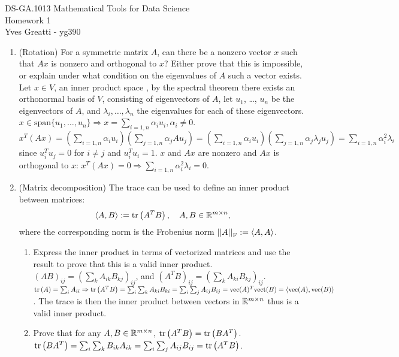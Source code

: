 \documentclass[12pt,twoside]{article}
\begin{document}
\noindent DS-GA.1013 Mathematical Tools for Data Science \\
Homework 1 \\
Yves Greatti - yg390\\


\begin{enumerate}
\item (Rotation) For a symmetric matrix $A$, can there be a nonzero vector $x$ such that $Ax$ is nonzero and orthogonal to $x$? Either prove that this is impossible, or explain under what condition on the eigenvalues of $A$ such a vector exists.
Let $x \in V$, an inner product space , by the spectral theorem there exists an orthonormal basis of  $V$, consisting of eigenvectors of $A$, let $u_1$, \ldots, $u_n$ be the eigenvectors of $A$, and $\lambda_i, \ldots, \lambda_n$ the eigenvalues for each of these eigenvectors.
$x \in \text{span}\{u_1, \ldots, u_n \} \Rightarrow  x=\sum_{i=1,n} \alpha_i u_i, \alpha_i \neq 0$.  $x^T (Ax) = (\sum_{i=1,n} \alpha_i u_i) (\sum_{j=1,n} \alpha_j A u_j) =  (\sum_{i=1,n} \alpha_i u_i) (\sum_{j=1,n} \alpha_j \lambda_j u_j) = \sum_{i=1,n} \alpha_i^2 \lambda_i$ since $u_i^T u_j = 0$ for $i \neq j$ and $u_i^T u_i =1$. $x$ and $Ax$ are nonzero and $Ax$ is orthogonal to $x$: $x^T (Ax) = 0 \Rightarrow  \sum_{i=1,n} \alpha_i^2 \lambda_i = 0$.

\item (Matrix decomposition) The trace can be used to define an inner product between matrices:
\begin{align}
\left \langle A, B\right \rangle := \operatorname{tr}\left( A^TB \right), \quad A,B \in \mathbb{R}^{m \times n},
\end{align}
where the corresponding norm is the Frobenius norm $\left|\left| A \right|\right| _{\operatorname{F}}:=\left \langle A, A\right \rangle$.
\begin{enumerate}
\item Express the inner product in terms of vectorized matrices and use the result to prove that this is a valid inner product.
$(A B)_{ij} = (\sum_k A_{ik} B_{kj})_{ij}$, and $(A^TB) _{ij} = (\sum_k A_{ki} B_{kj})_{ij}$.
$\operatorname{tr}\left( A \right) = \sum_i A_{ii}  \Rightarrow \operatorname{tr}\left( A^TB \right) = \sum_i \sum_k A_{ki} B_{ki} = \sum_i \sum_j A_{ij} B_{ij} = \text{vec}(A)^T \text{vect}(B) = \left \langle \text{vec}(A), \text{vec}(B)\right \rangle$.
The trace is then the inner product between vectors in $\mathbb{R}^{m \times n}$ thus is a valid inner product.

\item Prove that for any $A,B \in \mathbb{R}^{m \times n}$, $\operatorname{tr}\left( A^TB \right)=\operatorname{tr}\left( BA^T \right)$.
$\operatorname{tr}\left( BA^T \right) =  \sum_i \sum_k B_{ik} A_{ik} =  \sum_i \sum_j A_{ij} B_{ij} =  \operatorname{tr}\left( A^TB \right)$.


\end{enumerate}
\end{enumerate}
\end{document}
